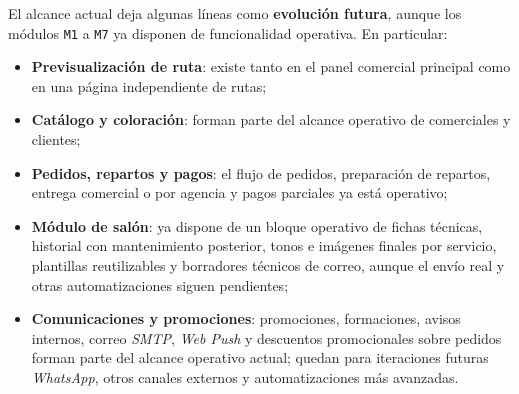 El alcance actual deja algunas líneas como \textbf{evolución futura}, aunque los módulos \texttt{M1} a \texttt{M7} ya disponen de funcionalidad operativa. En particular:

\begin{itemize}
    \item \textbf{Previsualización de ruta}: existe tanto en el panel comercial principal como en una página independiente de rutas;
    \item \textbf{Catálogo y coloración}: forman parte del alcance operativo de comerciales y clientes;
    \item \textbf{Pedidos, repartos y pagos}: el flujo de pedidos, preparación de repartos, entrega comercial o por agencia y pagos parciales ya está operativo;
    \item \textbf{Módulo de salón}: ya dispone de un bloque operativo de fichas técnicas, historial con mantenimiento posterior, tonos e imágenes finales por servicio, plantillas reutilizables y borradores técnicos de correo, aunque el envío real y otras automatizaciones siguen pendientes;
    \item \textbf{Comunicaciones y promociones}: promociones, formaciones, avisos internos, correo \textit{SMTP}, \textit{Web Push} y descuentos promocionales sobre pedidos forman parte del alcance operativo actual; quedan para iteraciones futuras \textit{WhatsApp}, otros canales externos y automatizaciones más avanzadas.
\end{itemize}
